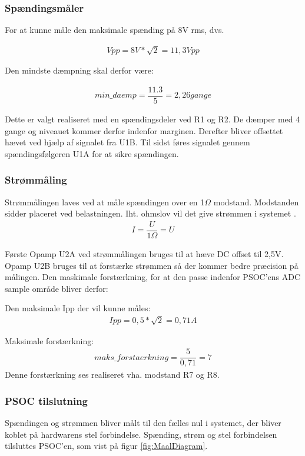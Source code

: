\subsubsection{Spændingsmåler}
For at kunne måle den maksimale spænding på 8V rms, dvs.

\begin{align}
Vpp = 8V*\sqrt{2} = 11,3Vpp
\end{align}

Den mindste dæmpning skal derfor være:

\begin{align}
min\_daemp = \dfrac{11.3}{5} = 2,26 gange
\end{align}

Dette er valgt realiseret med en spændingsdeler ved R1 og R2. De dæmper med 4 gange og niveauet kommer derfor indenfor marginen.
Derefter bliver offsettet hævet ved hjælp af signalet fra U1B. Til sidst føres signalet gennem spændingsfølgeren U1A for at sikre spændingen.

\subsubsection{Strømmåling}
Strømmålingen laves ved at måle spændingen over en 1$\Omega$ modstand. Modstanden sidder placeret ved belastningen. Iht. ohmslov vil det give strømmen i systemet
.
\begin{align}
	I = \dfrac{U}{1\Omega} = U
\end{align}

Første Opamp U2A ved strømmålingen bruges til at hæve DC offset til 2,5V. Opamp U2B bruges til at forstærke strømmen så der kommer bedre præcision på målingen. Den maskimale forstærkning, for at den passe indenfor PSOC'ens ADC sample område bliver derfor:

Den maksimale Ipp der vil kunne måles:
\begin{align}
Ipp = 0,5*\sqrt{2} = 0,71A
\end{align}

Maksimale forstærkning:
\begin{align}
maks\_forstaerkning = \dfrac{5}{0,71} = 7
\end{align}
Denne forstærkning ses realiseret vha. modstand R7 og R8.  

\subsubsection{PSOC tilslutning}
Spændingen og strømmen bliver målt til den fælles nul i systemet, der bliver koblet på hardwarens stel forbindelse. Spænding, strøm og stel forbindelsen tilsluttes PSOC'en, som vist på figur \ref{fig:MaalDiagram}.




